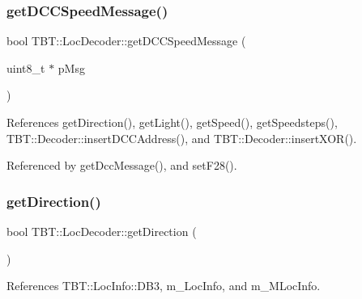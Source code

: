 \mbox{\label{classTBT_1_1LocDecoder_a34e4036b2f203797be32be1fb40c8e57_a34e4036b2f203797be32be1fb40c8e57}} 
\subsubsection{\texorpdfstring{get\+D\+C\+C\+Speed\+Message()}{getDCCSpeedMessage()}}
{\footnotesize\ttfamily bool T\+B\+T\+::\+Loc\+Decoder\+::get\+D\+C\+C\+Speed\+Message (\begin{DoxyParamCaption}\item[{uint8\+\_\+t $\ast$}]{p\+Msg }\end{DoxyParamCaption})\hspace{0.3cm}{\ttfamily [protected]}}



References get\+Direction(), get\+Light(), get\+Speed(), get\+Speedsteps(), T\+B\+T\+::\+Decoder\+::insert\+D\+C\+C\+Address(), and T\+B\+T\+::\+Decoder\+::insert\+X\+O\+R().



Referenced by get\+Dcc\+Message(), and set\+F28().

\mbox{\label{classTBT_1_1LocDecoder_a5c570e65adde5ee526986155d509da47_a5c570e65adde5ee526986155d509da47}} 
\subsubsection{\texorpdfstring{get\+Direction()}{getDirection()}}
{\footnotesize\ttfamily bool T\+B\+T\+::\+Loc\+Decoder\+::get\+Direction (\begin{DoxyParamCaption}{ }\end{DoxyParamCaption})\hspace{0.3cm}{\ttfamily [inline]}}



References T\+B\+T\+::\+Loc\+Info\+::\+D\+B3, m\+\_\+\+Loc\+Info, and m\+\_\+\+M\+Loc\+Info.



